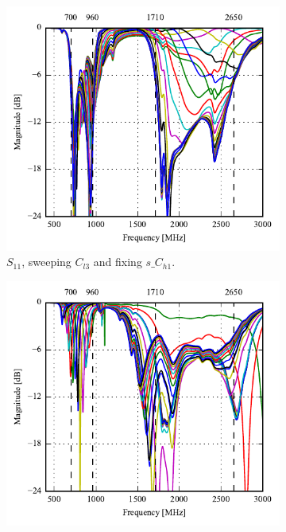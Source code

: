 \begin{figure}[htbp]
    \begin{subfigure}{0.49\linewidth}
        \centering
        \includegraphics{img/tech_sol/nonresonant/simulation/freespace/s11_top_sweep.pdf}
        \caption{$S_{11}$, sweeping $C_{l3}$ and fixing $s\_C_{h1}$.}
    \end{subfigure}
    \hfill 
    \begin{subfigure}{0.49\linewidth}
        \centering
        \includegraphics{img/tech_sol/nonresonant/simulation/freespace/s22_side_sweep.pdf}

\end{subfigure}
\end{figure}
